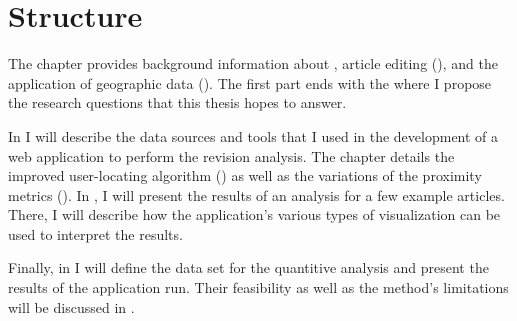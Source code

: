 \section{Structure}

The chapter  provides background information about , article editing (), and the application of geographic data ().
The first part ends with the  where I propose the research questions that this thesis hopes to answer.

In  I will describe the data sources and tools that I used in the development of a web application to perform the revision analysis. 
The chapter details the improved user-locating algorithm () as well as the variations of the proximity metrics ().
In , I will present the results of an analysis for a few example articles.
There, I will describe how the application's various types of visualization can be used to interpret the results.

Finally, in  I will define the data set for the quantitive analysis and present the results of the application run.
Their feasibility as well as the method's limitations will be discussed in .